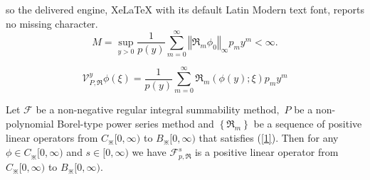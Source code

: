 \documentclass[10pt,a4paper]{amsart}
\begin{document}
so the delivered engine, XeLaTeX with its default Latin Modern text font, reports no missing character.
\begin{equation}
M=\sup_{y>0}\frac{1}{p(y)}\sum_{m=0}^{\infty}\left \Vert \Re_{m}\phi
_{0}\right \Vert _{\infty}p_{m}y^{m}<\infty.\label{1}%
\end{equation}

\begin{equation}
\mathcal{V}_{P,\Re}^{y}\phi \left(  \xi \right)  =\frac{1}{p(y)}\sum
_{m=0}^{\infty}\Re_{m}(\phi(y);\xi)p_{m}y^{m}\label{3}%
\end{equation}

\begin{proposition}
Let $\mathcal{F}$ be a non-negative regular integral summability method$,$ $P$
be a non-polynomial Borel-type power series method and $\left \{  \Re
_{m}\right \}  $ be a sequence of positive linear operators from
$C_{\divideontimes}[0,\infty)$ to $B_{\divideontimes}[0,\infty)$ that
satisfies (\ref{1}). Then for any $\phi \in C_{\divideontimes}[0,\infty)$ and
$s\in \mathbb{[}0,\infty \mathbb{)}$ we have $%
\mathcal{F}%
_{p,\Re}^{s}$ is a positive linear operator from $C_{\divideontimes}%
[0,\infty)$ to $B_{\divideontimes}[0,\infty).$
\end{proposition}
\end{document}
